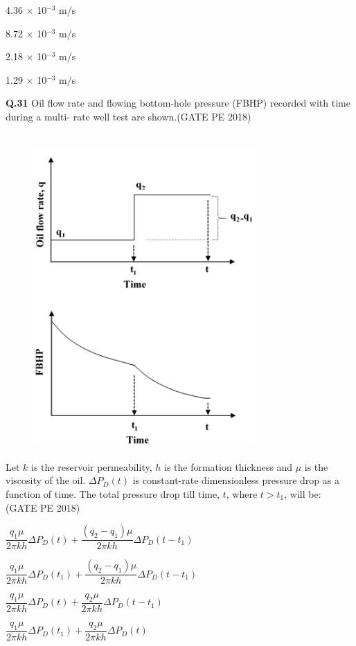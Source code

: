 \documentclass[journal,12pt,onecolumn]{IEEEtran}
\theoremstyle{remark}
\begin{document}
\begin{enumerate}
\begin{multicols}{2}

\item 4.36 $\times$ 10$^{-3}$ m/s \item 8.72 $\times$ 10$^{-3}$ m/s 
\item 2.18 $\times$ 10$^{-3}$ m/s \item 1.29 $\times$ 10$^{-3}$ m/s 
\end{multicols}
\end{enumerate}

\noindent
\textbf{Q.31} Oil flow rate and flowing bottom-hole pressure (FBHP) recorded with time during a multi-
rate well test are shown.\hfill(GATE PE 2018)\\\\

\begin{figure}[h!]
  \centering
  \includegraphics[width=0.5\columnwidth]{pic10.png} 
\end{figure}



Let $k$ is the reservoir permeability, $h$ is the formation thickness and $\mu$ is the viscosity of the oil. $\Delta P_D(t)$ is constant-rate dimensionless pressure drop as a function of time. The total pressure drop till time, $t$, where $t > t_1$, will be: \hfill (GATE PE 2018)

\begin{enumerate}
\begin{multicols}{2}
\item $\dfrac{q_1 \mu}{2 \pi k h} \Delta P_D(t) + \dfrac{(q_2 - q_1) \mu}{2 \pi k h} \Delta P_D(t - t_1)$ 

\item $\dfrac{q_1 \mu}{2 \pi k h} \Delta P_D(t_1) + \dfrac{(q_2 - q_1) \mu}{2 \pi k h} \Delta P_D(t - t_1)$

\item $\dfrac{q_1 \mu}{2 \pi k h} \Delta P_D(t) + \dfrac{q_2 \mu}{2 \pi k h} \Delta P_D(t - t_1)$

\item $\dfrac{q_1 \mu}{2 \pi k h} \Delta P_D(t_1) + \dfrac{q_2 \mu}{2 \pi k h} \Delta P_D(t)$
\end{multicols}
\end{enumerate}
\end{document}
